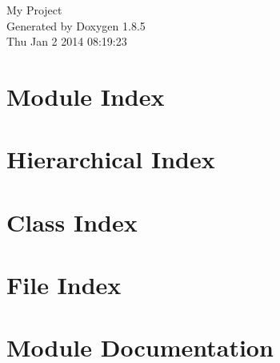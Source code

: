 \documentclass[twoside]{book}
\newcommand{\clearemptydoublepage}{%
  \newpage{\pagestyle{empty}\cleardoublepage}%
}
\begin{document}
\hypersetup{pageanchor=false}
\begin{titlepage}
\vspace*{7cm}
\begin{center}%
{\Large My Project }\\
\vspace*{1cm}
{\large Generated by Doxygen 1.8.5}\\
\vspace*{0.5cm}
{\small Thu Jan 2 2014 08:19:23}\\
\end{center}
\end{titlepage}
\clearemptydoublepage
\tableofcontents
\clearemptydoublepage
{}
\hypersetup{pageanchor=true}

\chapter{Module Index}

\chapter{Hierarchical Index}

\chapter{Class Index}

\chapter{File Index}

\chapter{Module Documentation}





\end{document}
